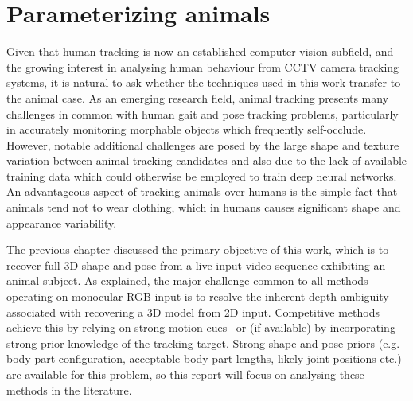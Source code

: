 

\section{Parameterizing animals}
    Given that human tracking is now an established computer vision subfield, and the growing interest in analysing human behaviour from CCTV camera tracking systems, it is natural to ask whether the techniques used in this work transfer to the animal case. As an emerging research field, animal tracking presents many challenges in common with human gait and pose tracking problems, particularly in accurately monitoring morphable objects which frequently self-occlude. However, notable additional challenges are posed by the large shape and texture variation between animal tracking candidates and also due to the lack of available training data which could otherwise be employed to train deep neural networks. An advantageous aspect of tracking animals over humans is the simple fact that animals tend not to wear clothing, which in humans causes significant shape and appearance variability.

    The previous chapter discussed the primary objective of this work, which is to recover full 3D shape and pose from a live input video sequence exhibiting an animal subject. As explained, the major challenge common to all methods operating on monocular RGB input is to resolve the inherent depth ambiguity associated with recovering a 3D model from 2D input. Competitive methods achieve this by relying on strong motion cues~\cite{kinect_fusion} or (if available) by incorporating strong prior knowledge of the tracking target. Strong shape and pose priors (e.g. body part configuration, acceptable body part lengths, likely joint positions etc.) are available for this problem, so this report will focus on analysing these methods in the literature.
    
